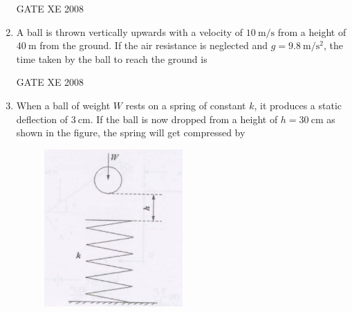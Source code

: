 \documentclass[12pt]{article}
\begin{document}
\begin{enumerate}
\begin{enumerate}
\end{enumerate}

    GATE XE 2008

    \item A ball is thrown vertically upwards with a velocity of $10 \ \mathrm{m/s}$ from a height of $40 \ \mathrm{m}$ from the ground. If the air resistance is neglected and $g = 9.8 \ \mathrm{m/s^2}$, the time taken by the ball to reach the ground is

\begin{enumerate}
\end{enumerate}

    GATE XE 2008


    \item When a ball of weight $W$ rests on a spring of constant $k$, it produces a static deflection of $3\ \mathrm{cm}$. If the ball is now dropped from a height of $h = 30\ \mathrm{cm}$ as shown in the figure, the spring will get compressed by  

    \begin{figure}[H]
    \centering
    \includegraphics[width=0.5\textwidth]{figs/ass1_f_q20.png}
    \caption{}
    \end{figure}


\end{enumerate}
\end{document}
